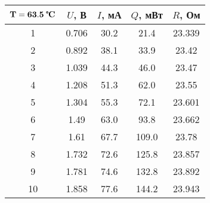 \begin{tabular}{ccccc}
\toprule
$\mathbf{T = 63.5}\;\textbf{\textcelsius}$ & $U$, В & $I$, мА & $Q$, мВт & $R$, Ом \\
\midrule
1 & 0.706 & 30.2 & 21.4 & 23.339 \\
2 & 0.892 & 38.1 & 33.9 & 23.42 \\
3 & 1.039 & 44.3 & 46.0 & 23.47 \\
4 & 1.208 & 51.3 & 62.0 & 23.55 \\
5 & 1.304 & 55.3 & 72.1 & 23.601 \\
6 & 1.49 & 63.0 & 93.8 & 23.662 \\
7 & 1.61 & 67.7 & 109.0 & 23.78 \\
8 & 1.732 & 72.6 & 125.8 & 23.857 \\
9 & 1.781 & 74.6 & 132.8 & 23.892 \\
10 & 1.858 & 77.6 & 144.2 & 23.943 \\
\bottomrule
\end{tabular}
